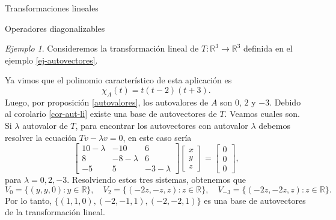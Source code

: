 \documentclass[a4paper,12pt,twoside,spanish,reqno]{amsbook}
\numberwithin{equation}{section}
\theoremstyle{definition}
\theoremstyle{remark}
\newtheorem*{ejemplo*}{Ejemplo}
\newcommand{\R}{\mathbb R}
\begin{document}
\begin{chapter}{Transformaciones lineales}
\begin{section}{Operadores diagonalizables}
        \begin{ejemplo*} Consideremos la transformación lineal de $T:\R^3\to\R^3$  definida en el ejemplo \ref{ej-autovectores}.

        Ya vimos que  el  polinomio característico de esta aplicación es 
        $$
        \chi_A(t) = t (t-2)(t+3).
        $$
        Luego, por 	proposición \ref{autovalores}, los autovalores de $A$ son $0$, $2$ y $-3$. Debido al corolario \ref{cor-aut-li} existe una base de autovectores de $T$. Veamos cuales son. Si $\lambda$ autovalor de $T$, para encontrar los autovectores con autovalor $\lambda$  debemos resolver la ecuación $Tv -\lambda v=0 $,  en este caso sería
        \begin{equation*}
        \begin{bmatrix}10- \lambda &-10&6\\8& -8- \lambda & 6\\-5& 5& -3- \lambda \end{bmatrix}
        \begin{bmatrix} x\\y\\z \end{bmatrix} =
        \begin{bmatrix} 0\\0 \\0\end{bmatrix},
        \end{equation*}  
        para $\lambda =0, 2,-3$. Resolviendo estos tres sistemas, obtenemos que 
        \begin{equation*}
            V_0 = \{(y,y,0): y \in \R \},\quad V_2 = \{(-2z,-z,z): z \in \R \},\quad V_{-3} = \{(-2z,-2z,z): z \in \R \}. 
        \end{equation*}
        Por lo tanto, $\{(1,1,0), (-2,-1,1), (-2,-2,1)\}$ es una base de autovectores de la transformación lineal. 
        \end{ejemplo*}
        

\end{section}
\end{chapter}
\end{document}
